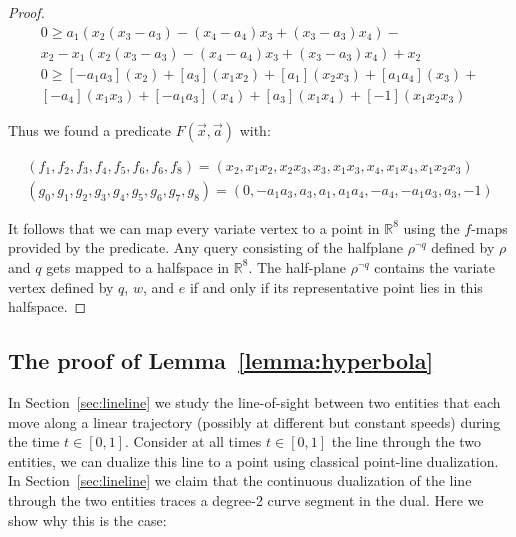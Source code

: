 \documentclass[UKenglish]{lipics-v2019}
\begin{document}
\begin{proof}
\begin{align*}
    0 \ge a_1 (x_2 (x_3 - a_3) - (x_4 - a_4)x_3 + (x_3 - a_3) x_4) - \\
    x_2 - x_1 (x_2 (x_3 - a_3) - (x_4 - a_4)x_3 + (x_3 - a_3) x_4) + x_2 \\
    0 \ge [-a_1 a_3] (x_2) + [a_3]( x_1 x_2) + [a_1] (x_2 x_3) + [a_1a_4] (x_3) + \\
    [- a_4] (x_1 x_3) + [- a_1 a_3]( x_4) + [a_3] (x_1 x_4) + [-1](x_1 x_2 x_3)
\end{align*}

Thus we found a predicate $F(\vec{x}, \vec{a})$ with:

\begin{align*}
    (f_1, f_2, f_3, f_4, f_5, f_6, f_6, f_8) = (x_2, x_1x_2, x_2x_3, x_3, x_1x_3, x_4, x_1x_4, x_1x_2x_3) \\
    (g_0, g_1, g_2, g_3, g_4, g_5,g_6, g_7,g_8) = (0, -a_1a_3, a_3, a_1, a_1a_4, -a_4, -a_1a_3, a_3, -1)
\end{align*}

It follows that we can map every variate vertex to a point in $\mathbb{R}^8$
using the $f$-maps provided by the predicate. Any query consisting of the
halfplane $\rho^{\neg q}$ defined by $\rho$ and $q$ gets mapped to a halfspace
in $\mathbb{R}^8$. The half-plane $\rho^{\neg q}$ contains the variate vertex
defined by $q$, $w$, and $e$ if and only if its representative point lies in
this halfspace.
\end{proof}


\subsection{The proof of Lemma~\ref{lemma:hyperbola} }

In Section~\ref{sec:lineline} we study the line-of-sight between two entities that each move along a linear trajectory (possibly at different but constant speeds) during the time $t \in [0,1]$. Consider at all times $t \in [0,1]$ the line through the two entities, we can dualize this line to a point using classical point-line dualization. In Section~\ref{sec:lineline} we claim that the continuous dualization of the line through the two entities traces a degree-2 curve segment in the dual. Here we show why this is the case:
\end{document}
